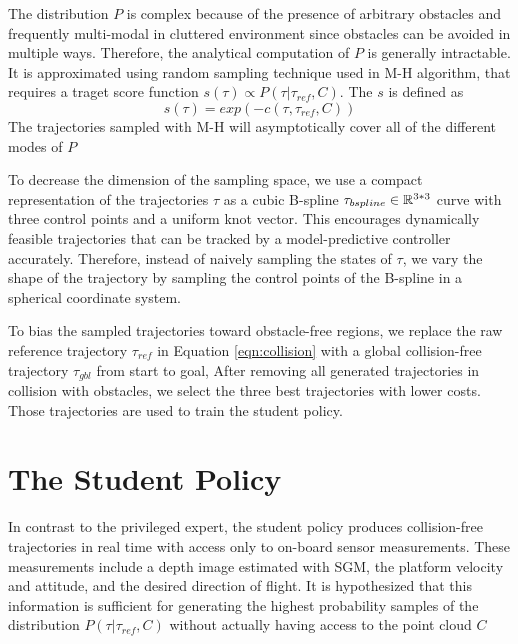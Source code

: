 The distribution $P$ is complex because of the presence of arbitrary obstacles and frequently multi-modal in cluttered environment since obstacles can be avoided in multiple ways. Therefore, the analytical computation of $P$ is generally intractable. It is approximated using random sampling technique used in M-H algorithm, that requires a traget score function $s(\tau) \propto P(\tau | \tau_{ref},C)$. The $s$ is defined as 
\begin{equation}
	s(\tau) = exp(-c(\tau, \tau_{ref},C))
\end{equation}
The trajectories sampled with M-H will asymptotically cover all of the different modes of $P$


To decrease the dimension of the sampling space, we use a compact
representation of the trajectories $\tau$ as a cubic B-spline $\tau_{bspline} \in \mathbb{R}^{3*3}$ curve with three control points and a
uniform knot vector. This encourages dynamically feasible trajectories that can be tracked by a model-predictive controller accurately. Therefore, instead of naively sampling the states of $\tau$, we vary the
shape of the trajectory by sampling the control points of the B-spline in a spherical coordinate system.

To bias the sampled trajectories toward obstacle-free regions, we replace the raw reference trajectory $\tau_{ref}$ in Equation \ref{eqn:collision} with a global
collision-free trajectory $\tau_{gbl}$ from start to goal, After removing all generated trajectories
in collision with obstacles, we select the three best trajectories with
lower costs. Those trajectories are used to train the student policy.


\section{The Student Policy}
In contrast to the privileged expert, the student policy produces
collision-free trajectories in real time with access only to on-board
sensor measurements. These measurements include a depth image
estimated with SGM, the platform velocity and attitude, and the
desired direction of flight. It is hypothesized that this information is
sufficient for generating the highest probability samples of the distribution $P(\tau | \tau_{ref}, C)$ without actually having access to the point cloud $C$ 

